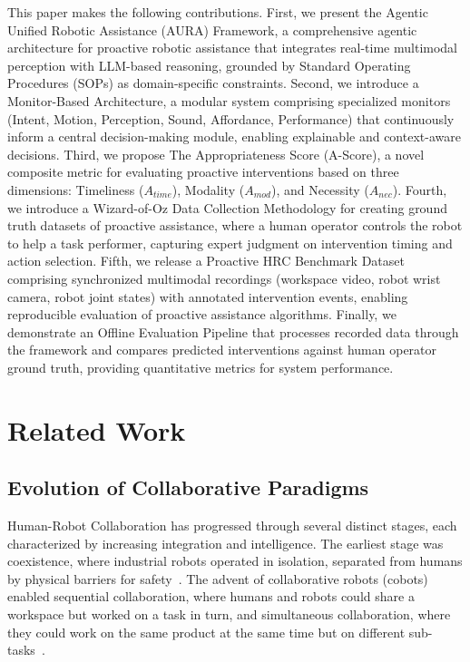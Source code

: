 \documentclass[sensors,article,submit,pdftex,moreauthors]{Definitions/mdpi}
\begin{document}
This paper makes the following contributions. First, we present the Agentic Unified Robotic Assistance (AURA) Framework, a comprehensive agentic architecture for proactive robotic assistance that integrates real-time multimodal perception with LLM-based reasoning, grounded by Standard Operating Procedures (SOPs) as domain-specific constraints. Second, we introduce a Monitor-Based Architecture, a modular system comprising specialized monitors (Intent, Motion, Perception, Sound, Affordance, Performance) that continuously inform a central decision-making module, enabling explainable and context-aware decisions. Third, we propose The Appropriateness Score (A-Score), a novel composite metric for evaluating proactive interventions based on three dimensions: Timeliness ($A_{time}$), Modality ($A_{mod}$), and Necessity ($A_{nec}$). Fourth, we introduce a Wizard-of-Oz Data Collection Methodology for creating ground truth datasets of proactive assistance, where a human operator controls the robot to help a task performer, capturing expert judgment on intervention timing and action selection. Fifth, we release a Proactive HRC Benchmark Dataset comprising synchronized multimodal recordings (workspace video, robot wrist camera, robot joint states) with annotated intervention events, enabling reproducible evaluation of proactive assistance algorithms. Finally, we demonstrate an Offline Evaluation Pipeline that processes recorded data through the  framework and compares predicted interventions against human operator ground truth, providing quantitative metrics for system performance.

\section{Related Work}

\subsection{Evolution of Collaborative Paradigms}

Human-Robot Collaboration has progressed through several distinct stages, each characterized by increasing integration and intelligence. The earliest stage was coexistence, where industrial robots operated in isolation, separated from humans by physical barriers for safety~\cite{Asad2023}. The advent of collaborative robots (cobots) enabled sequential collaboration, where humans and robots could share a workspace but worked on a task in turn, and simultaneous collaboration, where they could work on the same product at the same time but on different sub-tasks~\cite{Zhou2024}.
\end{document}
